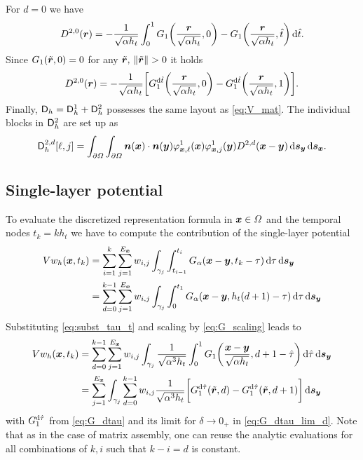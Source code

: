 \documentclass[a4paper,11pt]{article}
\begin{document}
For $d=0$ we have
\begin{equation*}
  D^{2,0}({{\bm{r}}}) = -\frac{1}{\sqrt{\alpha h_t}} \int_0^1 G_1\bigg(\frac{{{\bm{r}}}}{\sqrt{\alpha h_t}},0\bigg) - G_1\bigg(\frac{{{\bm{r}}}}{\sqrt{\alpha h_t}},\hat t\bigg) \,{\mathrm{d}} \hat t.
\end{equation*}
Since $G_1(\tilde {{{\bm{r}}}},0) = 0$ for any $\tilde \vr,\,\|\tilde \vr\|>0$ it holds
\begin{equation*}
  D^{2,0}({{\bm{r}}}) = -\frac{1}{\sqrt{\alpha h_t}} \bigg[ G_1^{{\mathrm{d}}\hat t}\bigg( \frac{{{\bm{r}}}}{\sqrt{\alpha h_t}}, 0 \bigg) - G_1^{{\mathrm{d}}\hat t}\bigg( \frac{{{\bm{r}}}}{\sqrt{\alpha h_t}}, 1 \bigg) \bigg].
\end{equation*}
Finally, ${{\mathsf{D}}}_h = {{\mathsf{D}}}_h^1 + {{\mathsf{D}}}_h^2$ possesses the same layout as \eqref{eq:V_mat}. The individual blocks in ${{\mathsf{D}}}_h^2$ are set up as
\begin{equation*}
  {\ensuremath{{\mathsf{D}}}}^{2,d}_h[ \ell , j ] = \int_{\partial\Omega} \int_{\partial\Omega} {{\bm{n}}}({{\bm{x}}}) \cdot {\ensuremath{{\bm{n}}}}({{\bm{y}}}) \varphi^1_{{{\bm{x}}},\ell}({{\bm{x}}}) \varphi^1_{{{\bm{x}}},j}({{\bm{y}}}) D^{2,d}({{\bm{x}}}-{{\bm{y}}}) \,{\mathrm{d}}{{\bm{s}}}_{{\bm{y}}} \,{\mathrm{d}}{{\bm{s}}}_{{\bm{x}}}.
\end{equation*}

\subsection{Single-layer potential}

To evaluate the discretized representation formula in ${{\bm{x}}}\in\Omega$ and the temporal nodes $t_k = k h_t$ we have to compute the contribution of the single-layer potential
\begin{align*}
 Vw_h({{\bm{x}}}, t_k) &= \sum_{i=1}^{k} \sum_{j=1}^{E_{{\bm{x}}}} w_{i,j} \int_{\gamma_j} \int_{t_{i-1}}^{t_i} G_\alpha({{\bm{x}}}-{{\bm{y}}},t_k-\tau) \,{\mathrm{d}}\tau \,{\mathrm{d}}{{\bm{s}}}_{{\bm{y}}} \\
 &= \sum_{d=0}^{k-1} \sum_{j=1}^{E_{{\bm{x}}}} w_{i,j} \int_{\gamma_j} \int_{0}^{t_1} G_\alpha({{\bm{x}}}-{{\bm{y}}},h_t(d+1)-\tau) \,{\mathrm{d}}\tau \,{\mathrm{d}}{{\bm{s}}}_{{\bm{y}}}
\end{align*}
Substituting \eqref{eq:subst_tau_t} and scaling by \eqref{eq:G_scaling} leads to
\begin{align*}
  Vw_h({{\bm{x}}}, t_k) &= \sum_{d=0}^{k-1} \sum_{j=1}^{E_{{\bm{x}}}} w_{i,j} \int_{\gamma_j} \frac{1}{\sqrt{\alpha^3 h_t}}\int_0^1 G_1\bigg(\frac{{{\bm{x}}}-{{\bm{y}}}}{\sqrt{\alpha h_t}},d+1-\hat\tau\bigg) \,{\mathrm{d}}\hat\tau \,{\mathrm{d}}{{\bm{s}}}_{{\bm{y}}} \\
  &= \sum_{j=1}^{E_{{\bm{x}}}} \int_{\gamma_j} \sum_{d=0}^{k-1} w_{i,j} \frac{1}{\sqrt{\alpha^3 h_t}} \bigg[ G_1^{{\mathrm{d}}\hat\tau}(\tilde {{{\bm{r}}}}, d) - G_1^{{\mathrm{d}}\hat\tau}(\tilde {{{\bm{r}}}}, d+1) \bigg] \,{\mathrm{d}}{{\bm{s}}}_{{\bm{y}}}
\end{align*}
with $G_1^{{\mathrm{d}}\hat\tau}$ from \eqref{eq:G_dtau} and its limit for $\delta \to 0_+$ in \eqref{eq:G_dtau_lim_d}. Note that as in the case of matrix assembly, one can reuse the analytic evaluations for all combinations of $k,i$ such that $k-i=d$ is constant.
\end{document}
